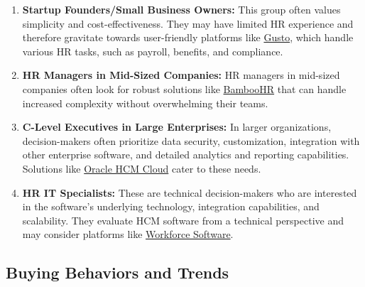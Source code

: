 \documentclass[
  a4paper,
]{book}
\renewcommand{\labelenumi}{\textbf{\textcolor{com-color}{\arabic*.}}}%
\begin{document}
\begin{enumerate}
\def\labelenumi{\arabic{enumi}.}
\item
  \textbf{Startup Founders/Small Business Owners:} This group often
  values simplicity and cost-effectiveness. They may have limited HR
  experience and therefore gravitate towards user-friendly platforms
  like \href{https://gusto.com/}{Gusto}, which handle various HR tasks,
  such as payroll, benefits, and compliance.
\item
  \textbf{HR Managers in Mid-Sized Companies:} HR managers in mid-sized
  companies often look for robust solutions like
  \href{https://www.bamboohr.com/}{BambooHR} that can handle increased
  complexity without overwhelming their teams.
\item
  \textbf{C-Level Executives in Large Enterprises:} In larger
  organizations, decision-makers often prioritize data security,
  customization, integration with other enterprise software, and
  detailed analytics and reporting capabilities. Solutions like
  \href{https://www.oracle.com/human-capital-management/cloud/}{Oracle
  HCM Cloud} cater to these needs.
\item
  \textbf{HR IT Specialists:} These are technical decision-makers who
  are interested in the software's underlying technology, integration
  capabilities, and scalability. They evaluate HCM software from a
  technical perspective and may consider platforms like
  \href{https://www.workforcesoftware.com/}{Workforce Software}.
\end{enumerate}

\hypertarget{buying-behaviors-and-trends}{%
\subsection{Buying Behaviors and
Trends}\label{buying-behaviors-and-trends}}
\end{document}
